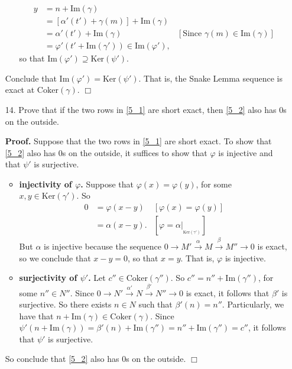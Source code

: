 \documentclass[9pt]{article}
\newcommand{\qed}{\hfill \ensuremath{\Box}}
\newcommand{\Ker}{\text{Ker}}
\newcommand{\Coker}{\text{Coker}}
\newcommand{\im}{\text{Im}}
\begin{document}
\begin{enumerate}
\begin{itemize}
               \begin{align*}
                  y &= n + \im(\gamma) \\
                    &= [\alpha'(t') + \gamma(m)] + \im(\gamma) \\
                    &= \alpha'(t') + \im(\gamma) &[\text{Since }\gamma(m)
                          \in \im(\gamma)] \\
                    &= \varphi'(t' + \im(\gamma')) \in \im(\varphi'),
               \end{align*}
               so that $\im(\varphi') \supseteq \Ker(\psi')$.
      \end{itemize}
      Conclude that $\im(\varphi') = \Ker(\psi')$. That is, the
      Snake Lemma sequence is exact at $\Coker(\gamma)$. \qed
   \item[14.]  Prove that if the two rows in \eqref{5_1} are short exact, then
               \eqref{5_2} also has 0s on the outside.

      \textbf{Proof.} Suppose that the two rows in \eqref{5_1} are short exact.
      To show that \eqref{5_2} also has 0s on the outside, it suffices to show
      that $\varphi$ is injective and that $\psi'$ is surjective.

      \begin{itemize}
         \item \textbf{injectivity of $\varphi$.} Suppose that
               $\varphi(x) = \varphi(y)$, for some $x, y \in \Ker(\gamma')$. So
               \begin{align*}
                  0 &= \varphi(x - y) &[\varphi(x) = \varphi(y)] \\
                    &= \alpha(x - y). &[\varphi = \alpha|_{_{\Ker(\gamma')}}]
               \end{align*}
               But $\alpha$ is injective because the sequence $0 \rightarrow M'
               \stackrel{\alpha}{\longrightarrow} M
               \stackrel{\beta}{\longrightarrow}M'' \rightarrow 0$ is exact, so
               we conclude that $x - y = 0$, so that $x = y$. That is, $\varphi$
               is injective.
         \item \textbf{surjectivity of $\psi'$.} Let $c'' \in \Coker(\gamma'')$.
               So $c'' = n'' + \im(\gamma'')$, for some $n'' \in N''$. Since
               $0 \rightarrow N'\stackrel{\alpha'}{\longrightarrow} N
               \stackrel{\beta'}{\longrightarrow}N'' \rightarrow 0$ is exact, it
               follows that $\beta'$ is surjective. So there exists $n \in N$
               such that $\beta'(n) = n''$. Particularly, we have that
               $n + \im(\gamma) \in \Coker(\gamma)$. Since
               $\psi'(n + \im(\gamma)) = \beta'(n) + \im(\gamma'') =
                n'' + \im(\gamma'') = c''$, it follows that $\psi'$ is
               surjective.
      \end{itemize}
      So conclude that \eqref{5_2} also has 0s on the outside. \qed
\end{enumerate}
\end{document}
